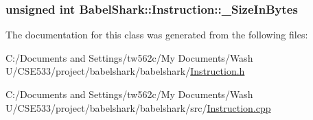 \hypertarget{class_babel_shark_1_1_instruction_7cdc8ffade0294ee675c62d13cd01adb}{
\subsubsection[{\_\-SizeInBytes}]{\setlength{\rightskip}{0pt plus 5cm}unsigned int {\bf BabelShark::Instruction::\_\-SizeInBytes}}}
\label{class_babel_shark_1_1_instruction_7cdc8ffade0294ee675c62d13cd01adb}




The documentation for this class was generated from the following files:\begin{CompactItemize}
\item 
C:/Documents and Settings/tw562c/My Documents/Wash U/CSE533/project/babelshark/babelshark/\hyperlink{_instruction_8h}{Instruction.h}\item 
C:/Documents and Settings/tw562c/My Documents/Wash U/CSE533/project/babelshark/babelshark/src/\hyperlink{_instruction_8cpp}{Instruction.cpp}\end{CompactItemize}
